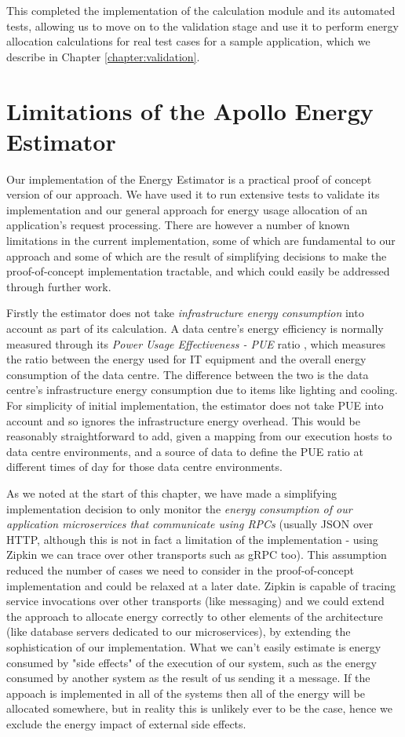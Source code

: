 This completed the implementation of the calculation module and its automated tests, allowing us to move on to the validation stage and use it to perform energy allocation calculations for real test cases for a sample application, which we describe in Chapter \ref{chapter:validation}.

\section{Limitations of the Apollo Energy Estimator}

Our implementation of the Energy Estimator is a practical proof of concept version of our approach.  We have used it to run extensive tests to validate its implementation and our general approach for energy usage allocation of an application's request processing.  There are however a number of known limitations in the current implementation, some of which are fundamental to our approach and some of which are the result of simplifying decisions to make the proof-of-concept implementation tractable, and which could easily be addressed through further work.

Firstly the estimator does not take \emph{infrastructure energy consumption} into account as part of its calculation.  A data centre's energy efficiency is normally measured through its \emph{Power Usage Effectiveness - PUE} ratio \cite{iso30134-pue}, which measures the ratio between the energy used for IT equipment and the overall energy consumption of the data centre.  The difference between the two is the data centre's infrastructure energy consumption due to items like lighting and cooling.  For simplicity of initial implementation, the estimator does not take PUE into account and so ignores the infrastructure energy overhead.  This would be reasonably straightforward to add, given a mapping from our execution hosts to data centre environments, and a source of data to define the PUE ratio at different times of day for those data centre environments.

As we noted at the start of this chapter, we have made a simplifying implementation decision to only monitor the \emph{energy consumption of our application microservices that communicate using RPCs} (usually JSON over HTTP, although this is not in fact a limitation of the implementation - using Zipkin we can trace over other transports such as gRPC too).  This assumption reduced the number of cases we need to consider in the proof-of-concept implementation and could be relaxed at a later date.  Zipkin is capable of tracing service invocations over other transports (like messaging) and we could extend the approach to allocate energy correctly to other elements of the architecture (like database servers dedicated to our microservices), by extending the sophistication of our implementation.  What we can't easily estimate is energy consumed by "side effects" of the execution of our system, such as the energy consumed by another system as the result of us sending it a message.  If the appoach is implemented in all of the systems then all of the energy will be allocated somewhere, but in reality this is unlikely ever to be the case, hence we exclude the energy impact of external side effects.

